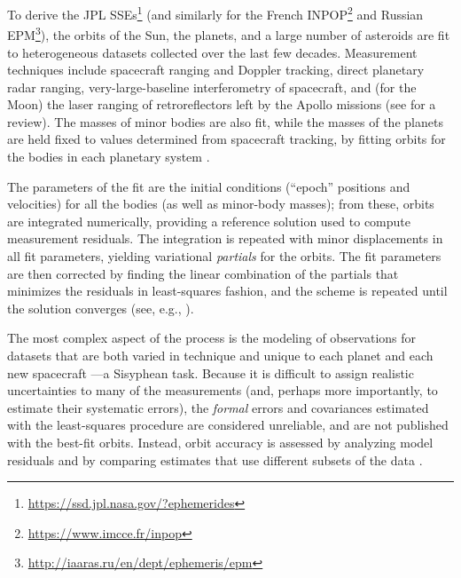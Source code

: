 \documentclass[iop,apj,twocolappendix]{emulateapj}
\begin{document}
To derive the JPL SSEs\footnote{\href{https://ssd.jpl.nasa.gov/?ephemerides}{https://ssd.jpl.nasa.gov/?ephemerides}} (and similarly for the French INPOP\footnote{\href{https://www.imcce.fr/inpop}{https://www.imcce.fr/inpop}} and Russian EPM\footnote{\href{http://iaaras.ru/en/dept/ephemeris/epm}{http://iaaras.ru/en/dept/ephemeris/epm}}),
the orbits of the Sun, the planets, and a large number of asteroids are fit to heterogeneous datasets collected over the last few decades. Measurement techniques include spacecraft ranging and Doppler tracking, direct planetary radar ranging, very-large-baseline interferometry of spacecraft, and (for the Moon) the laser ranging of retroreflectors left by the Apollo missions (see \citealt{verma2013} for a review). The masses of minor bodies are also fit, while the masses of the planets are held fixed to values determined from spacecraft tracking, by fitting orbits for the bodies in each planetary system \citep{jh+2000,2006AJ....132.2520J,2014AJ....148...76J,2009AJ....137.4322J}.

The parameters of the fit are the initial conditions (``epoch'' positions and velocities) for all the bodies (as well as minor-body masses); from these, orbits are integrated numerically, providing a reference solution used to compute measurement residuals.
The integration is repeated with minor displacements in all fit parameters, yielding variational \emph{partials} for the orbits. The fit parameters are then corrected by finding the linear combination of the partials that minimizes the residuals in least-squares fashion, and the scheme is repeated until the solution converges (see, e.g., \citealt{1983A&A...125..150N}).

The most complex aspect of the process is the modeling of observations for datasets that are both varied in technique and unique to each planet and each new spacecraft \citep{moyer2003}---a Sisyphean task. Because it is difficult to assign realistic uncertainties to many of the measurements (and, perhaps more importantly, to estimate their systematic errors), the \emph{formal} errors and covariances estimated with the least-squares procedure are considered unreliable, and are not published with the best-fit orbits. Instead, orbit accuracy is assessed by analyzing model residuals and by comparing estimates that use different subsets of the data \citep{de434cov,de438}.
\end{document}
